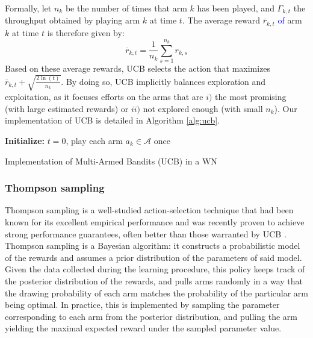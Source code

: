 \documentclass[preprint,12pt]{elsarticle}
\begin{document}
	Formally, let $n_k$ be the number of times that arm $k$ has been played, and $\Gamma_{k,t}$ the throughput obtained by playing arm $k$ at time $t$. The average reward $\overline{r}_{k,t}$ \textcolor{blue}{of} arm $k$ at time $t$ is therefore given by:
	\begin{equation}
	\label{eq:ucb}
	\overline{r}_{k,t} = \frac{1}{n_k} \sum_{s=1}^{n_k} r_{k,s}
	\nonumber
	\end{equation}	
	Based on these average rewards, UCB selects the action that maximizes $\overline{r}_{k,t} + \sqrt{\frac{2 \ln(t)}{n_k}}$. By doing so, UCB implicitly balances exploration and exploitation, as it focuses efforts on the arms that are $i)$ the most promising (with large estimated rewards) or $ii)$ not explored enough (with small $n_k$). Our implementation of UCB is detailed in Algorithm \ref{alg:ucb}.	
	
	\begin{algorithm}[]
		\SetAlgoLined
		\textbf{Initialize:} $t=0$, play each arm $a_k \in \mathcal{A}$ once\\
		\caption{Implementation of Multi-Armed Bandits (UCB) in a WN}
		\label{alg:ucb}			
	\end{algorithm}	
	
	\subsubsection{Thompson sampling}
	\label{section:bandits_thompsons}	
	Thompson sampling \cite{thompson1933likelihood} is a well-studied action-selection technique that had been known for its excellent empirical performance \cite{CL11} and was recently proven to achieve strong performance guarantees, often better than those warranted by UCB \cite{AG12,KKM12,KKM13}. Thompson sampling is a Bayesian algorithm: it constructs a probabilistic model of the rewards and assumes a prior distribution of the parameters of said model. Given the data collected during the learning procedure, this policy keeps track of the posterior distribution of the rewards, and pulls arms randomly in a way that the drawing probability of each arm matches the probability of the particular arm being optimal. In practice, this is implemented by sampling the parameter corresponding to each arm from the posterior distribution, and pulling the arm yielding the maximal expected reward under the sampled parameter value.
	
\end{document}
